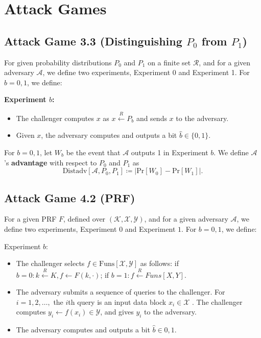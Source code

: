 \appendix
\section{Attack Games} \label{sec:ag}

\subsection{Attack Game 3.3 (Distinguishing $P_0$ from $P_1$)} \label{ag:3-3}

For given probability distributions $P_0$ and $P_1$ on a finite set $\mathcal{R}$, and for a given adversary $\mathcal{A}$, we define two experiments, Experiment 0 and Experiment 1.
For $b = 0,1$, we define:

\textbf{Experiment $b$:}
\begin{itemize}
    \item The challenger computes $x$ as $x \overset{R}{\longleftarrow} P_b$ and sends $x$ to the adversary.

    \item Given $x$, the adversary computes and outputs a bit $\hat{b} \in \{ 0,1 \}$.
\end{itemize}

For $b = 0,1$, let $W_b$ be the event that $\mathcal{A}$ outputs 1 in Experiment $b$.
We define $\mathcal{A}$'s \textbf{advantage} with respect to $P_0$ and $P_1$ as
\begin{equation*}
    \text{Distadv}[\mathcal{A}, P_0, P_1] \coloneqq \left\vert \text{Pr}[W_0] - \text{Pr}[W_1] \right\vert.
\end{equation*}

\subsection{Attack Game 4.2 (PRF)} \label{ag:4-2}

For a given PRF $F$, defined over $(\mathcal{K}, \mathcal{X} , \mathcal{Y})$, and for a given adversary $\mathcal{A}$, we define two experiments, Experiment $0$ and Experiment $1$. For $b = 0,1$, we define:

Experiment $b$:
\begin{itemize}
    \item The challenger selects $f \in \text{Funs}[\mathcal{X},\mathcal{Y}]$ as follows:
        if $b = 0: k \overset{R}{\leftarrow} K, f\leftarrow F(k, ·)$;
        if $b = 1: f \overset{R}{\leftarrow} Funs[X , Y]$.

    \item 
The adversary submits a sequence of queries to the challenger.
For $i = 1, 2,\ldots,$ the $i$th query is an input data block $x_{i} \in \mathcal{X}$ .
The challenger computes $y_{i}\leftarrow f(x_{i})\in \mathcal{Y}$, and gives $y_{i}$ to the adversary.
\item
The adversary computes and outputs a bit $\hat{b}\in {0,1}$.
\end{itemize}

